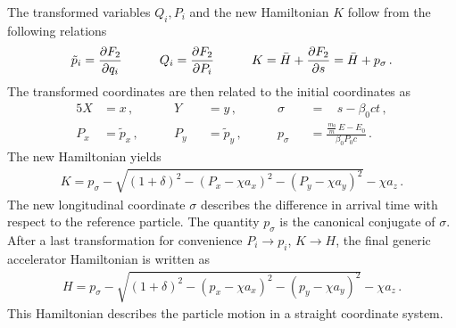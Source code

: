 \newpage
The transformed variables ${Q_i,P_i}$ and the new Hamiltonian $K$ follow from the following relations~\cite{DESY-95-189}
%
%
\begin{align}
\tilde{p}_i = \frac{\partial F_2}{\partial q_i} \quad \quad \quad Q_i = \frac{\partial F_2}{\partial P_i} \quad \quad \quad K = \bar{H} + \frac{\partial F_2}{\partial s} = \bar{H}+p_\sigma \, .
\end{align}
%
The transformed coordinates are then related to the initial coordinates as
%
\begin{alignat}{5}
X  &= x  \, ,          \quad \quad  &Y   &&= y  \, ,           \quad \quad &\sigma   &&= \phantom{m} s - \beta_0 ct \, ,  \\ \label{eq:sigmadefinition}
P_x&= \tilde{p}_x  \, , \quad \quad  &P_y &&= \tilde{p}_y \, ,  \quad \quad &p_\sigma &&= \frac{\frac{m_0}{m} \, E - E_0}{\beta_0 P_0 c} \, .
\end{alignat}
%
The new Hamiltonian yields
%
\begin{align}
K = p_\sigma - \sqrt{(1+\delta)^2 - (P_x - \chi a_x)^2 - (P_y-\chi a_y)^2} - \chi a_z \, .
\end{align}
%
The new longitudinal coordinate $\sigma$ describes the difference in arrival time with respect to the reference particle. The quantity $p_\sigma$ is the canonical conjugate of $\sigma$.
%
After a last transformation for convenience $P_i \rightarrow p_i$, $K \rightarrow H$, the final generic accelerator Hamiltonian is written as
\begin{align}
H = p_\sigma - \sqrt{(1+\delta)^2 - (p_x - \chi a_x)^2 - (p_y-\chi a_y)^2} - \chi a_z \, .
\end{align}
%
This Hamiltonian describes the particle motion in a straight coordinate system. 

